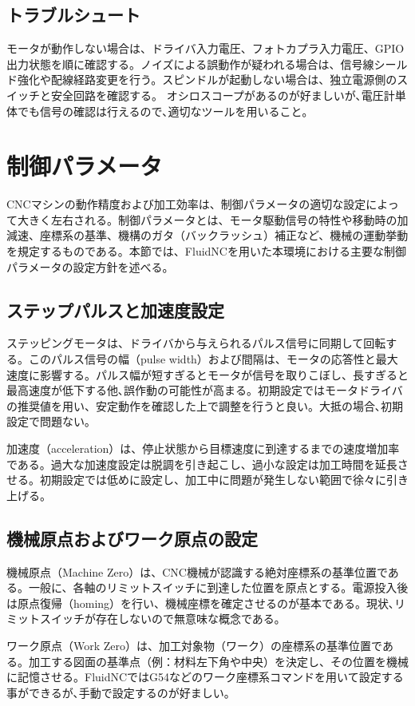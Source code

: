 \documentclass[uplatex,dvipdfmx]{ujarticle}
\begin{document}
\subsection{トラブルシュート}

モータが動作しない場合は、ドライバ入力電圧、フォトカプラ入力電圧、GPIO出力状態を順に確認する。ノイズによる誤動作が疑われる場合は、信号線シールド強化や配線経路変更を行う。スピンドルが起動しない場合は、独立電源側のスイッチと安全回路を確認する。
オシロスコープがあるのが好ましいが､電圧計単体でも信号の確認は行えるので､適切なツールを用いること｡


\section{制御パラメータ}

CNCマシンの動作精度および加工効率は、制御パラメータの適切な設定によって大きく左右される。制御パラメータとは、モータ駆動信号の特性や移動時の加減速、座標系の基準、機構のガタ（バックラッシュ）補正など、機械の運動挙動を規定するものである。本節では、FluidNCを用いた本環境における主要な制御パラメータの設定方針を述べる。

\subsection{ステップパルスと加速度設定}
ステッピングモータは、ドライバから与えられるパルス信号に同期して回転する。このパルス信号の幅（pulse width）および間隔は、モータの応答性と最大速度に影響する。パルス幅が短すぎるとモータが信号を取りこぼし、長すぎると最高速度が低下する他､誤作動の可能性が高まる。初期設定ではモータドライバの推奨値を用い、安定動作を確認した上で調整を行うと良い。大抵の場合､初期設定で問題ない｡

加速度（acceleration）は、停止状態から目標速度に到達するまでの速度増加率である。過大な加速度設定は脱調を引き起こし、過小な設定は加工時間を延長させる。初期設定では低めに設定し、加工中に問題が発生しない範囲で徐々に引き上げる。

\subsection{機械原点およびワーク原点の設定}
機械原点（Machine Zero）は、CNC機械が認識する絶対座標系の基準位置である。一般に、各軸のリミットスイッチに到達した位置を原点とする。電源投入後は原点復帰（homing）を行い、機械座標を確定させるのが基本である。現状､リミットスイッチが存在しないので無意味な概念である｡

ワーク原点（Work Zero）は、加工対象物（ワーク）の座標系の基準位置である。加工する図面の基準点（例：材料左下角や中央）を決定し、その位置を機械に記憶させる。FluidNCではG54などのワーク座標系コマンドを用いて設定する事ができるが､手動で設定するのが好ましい。
\end{document}
